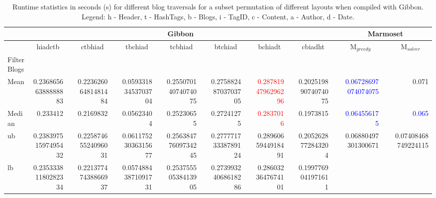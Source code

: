 \documentclass[acmsmall,review,anonymous]{acmart}\settopmatter{printfolios=true,printccs=false,printacmref=false}
\newcommand{\system}{{\sc Marmoset}\xspace}
\newcommand{\systemSolver}{{\sc M$_{\mathit{solver}}$}\xspace}
\newcommand{\systemGreedy}{{\sc M$_{\mathit{greedy}}$}\xspace}
\newcommand{\gibbon}{{\sc Gibbon}\xspace}
\newcommand{\ra}[1]{\renewcommand{\arraystretch}{#1}}
\newcommand{\fnumthree}[1]{ {\num[round-mode=places,round-precision=3, scientific-notation=false]{#1}}}
\begin{document}
\begin{table}[]
\small
\setlength{\tabcolsep}{2pt} \centering
\ra{1}
\caption{Runtime statistics in seconds (s) for different blog traversals for a subset permutation of different layouts when compiled with \gibbon.
 Legend: h - Header, t - HashTags, b - Blogs, i - TagID, c - Content, a - Author, d - Date.}
\begin{tabular}{@{}p{0.6in}rcrcrcrcrcrcrcrcr@{}}\toprule
 & \multicolumn{13}{|c|}{{\gibbon}} &
 & \multicolumn{3}{c|}{{\system}}\\ \midrule

 & \multicolumn{1}{c}{\small{{hiadctb}}} & 
 & \multicolumn{1}{c}{\small{{ctbhiad}}} &
 & \multicolumn{1}{c}{\small{{tbchiad}}} &
 & \multicolumn{1}{c}{\small{{tcbhiad}}} &
 & \multicolumn{1}{c}{\small{{btchiad}}} &
 & \multicolumn{1}{c}{\small{{bchiadt}}} &
 & \multicolumn{1}{c}{\small{{cbiadht}}} &
 & \multicolumn{1}{c}{\small{\systemGreedy}} &
 & \multicolumn{1}{c}{\small{\systemSolver}}\\ \midrule
Filter\:Blogs \\
Mean   & {\fnumthree{0.23686566388888883}}  
        &&  \fnumthree{0.22362606481481484}
		&&  {\fnumthree{0.05933183453703704}}
		&&  \fnumthree{0.25507014074074075}
		&& {\fnumthree{0.27588248703703705}}
		&&  \textcolor{red}{\fnumthree{0.2878194796296296}}
		&&  \fnumthree{0.20251989074074075} 
		&&   \textcolor{blue}{\fnumthree{0.06728697074074075}} 
		&&  {{{0.071}}}
		\\
Median &  {\fnumthree{0.233412}}  
        &&  \fnumthree{0.2169832}
		&&  {\fnumthree{0.05623404}}
		&&  \fnumthree{0.25230655}
		&&  {\fnumthree{0.27241275}}
		&&  \textcolor{red}{\fnumthree{0.2837016}}
		&&  \fnumthree{0.1973815} 
		&&   \textcolor{blue}{\fnumthree{0.064556175}} 
		&&  \textcolor{blue}{{0.065}}
		\\
ub            &  \fnumthree{0.23839751597495432}
              &&  \fnumthree{0.22587465524096031}
			  &&  \fnumthree{0.06117523036315677}
			  &&  \fnumthree{0.25638477609734245}
			  &&  \fnumthree{0.27777173338789124}
			  &&  \fnumthree{0.2896065944918491}
			  &&  \fnumthree{0.2052628772843204}
			  &&   \fnumthree{0.06880497301300671} 
			  &&  \fnumthree{0.07408468749224115}
			   \\
lb        &  \fnumthree{0.23533381180282334}
              &&  \fnumthree{0.22137747438866937}
			  &&  \fnumthree{0.05748843871091731}
			  &&  \fnumthree{0.25375550538413905}
			  &&  \fnumthree{0.27399324068618286}
			  &&  \fnumthree{0.2860323647674101}
			  &&  \fnumthree{0.1997769041971611}

\end{tabular}
\end{table}
\end{document}
